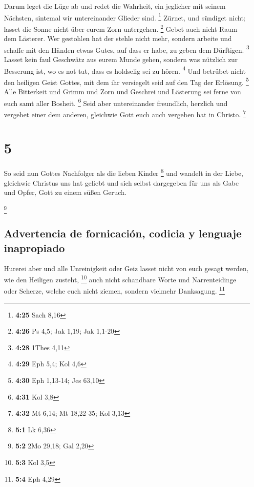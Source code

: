  Darum leget die Lüge ab und redet die Wahrheit, ein
jeglicher mit seinem Nächsten, sintemal wir untereinander Glieder sind.
\footnote{\textbf{4:25} Sach 8,16}  Zürnet, und sündiget
nicht; lasset die Sonne nicht über eurem Zorn untergehen. \footnote{\textbf{4:26}
  Ps 4,5; Jak 1,19; Jak 1,1-20}  Gebet auch nicht Raum
dem Lästerer.  Wer gestohlen hat der stehle nicht mehr,
sondern arbeite und schaffe mit den Händen etwas Gutes, auf dass er
habe, zu geben dem Dürftigen. \footnote{\textbf{4:28} 1Thes 4,11}
 Lasset kein faul Geschwätz aus eurem Munde gehen,
sondern was nützlich zur Besserung ist, wo es not tut, dass es holdselig
sei zu hören. \footnote{\textbf{4:29} Eph 5,4; Kol 4,6} 
Und betrübet nicht den heiligen Geist Gottes, mit dem ihr versiegelt
seid auf den Tag der Erlösung. \footnote{\textbf{4:30} Eph 1,13-14; Jes
  63,10}  Alle Bitterkeit und Grimm und Zorn und Geschrei
und Lästerung sei ferne von euch samt aller Bosheit. \footnote{\textbf{4:31}
  Kol 3,8}  Seid aber untereinander freundlich, herzlich
und vergebet einer dem anderen, gleichwie Gott euch auch vergeben hat in
Christo. \footnote{\textbf{4:32} Mt 6,14; Mt 18,22-35; Kol 3,13}

\hypertarget{section-4}{%
\section{5}\label{section-4}}

 So seid nun Gottes Nachfolger als die lieben Kinder
\footnote{\textbf{5:1} Lk 6,36}  und wandelt in der Liebe,
gleichwie Christus uns hat geliebt und sich selbst dargegeben für uns
als Gabe und Opfer, Gott zu einem süßen Geruch.

\footnote{\textbf{5:2} 2Mo 29,18; Gal 2,20}

\hypertarget{advertencia-de-fornicaciuxf3n-codicia-y-lenguaje-inapropiado}{%
\subsection{Advertencia de fornicación, codicia y lenguaje
inapropiado}\label{advertencia-de-fornicaciuxf3n-codicia-y-lenguaje-inapropiado}}

 Hurerei aber und alle Unreinigkeit oder Geiz lasset nicht
von euch gesagt werden, wie den Heiligen zusteht, \footnote{\textbf{5:3}
  Kol 3,5}  auch nicht schandbare Worte und Narrenteidinge
oder Scherze, welche euch nicht ziemen, sondern vielmehr Danksagung.
\footnote{\textbf{5:4} Eph 4,29}

